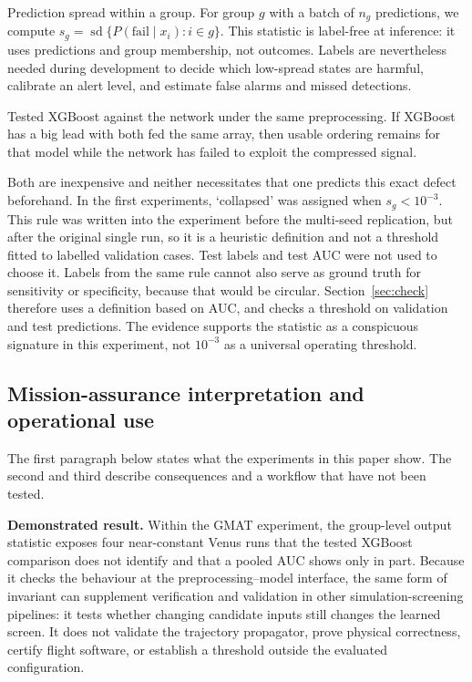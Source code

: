 \documentclass[preprint,12pt,authoryear,doubleblind]{elsarticle}
\begin{document}
Prediction spread within a group. For group $g$ with a batch of $n_g$ predictions, we compute $s_g=\operatorname{sd}\{P(\mathrm{fail}\mid x_i):i\in g\}$. This statistic is label-free at inference: it uses predictions and group membership, not outcomes. Labels are nevertheless needed during development to decide which low-spread states are harmful, calibrate an alert level, and estimate false alarms and missed detections.

Tested XGBoost against the network under the same preprocessing. If XGBoost has a big lead with both fed the same array, then usable ordering remains for that model while the network has failed to exploit the compressed signal.

Both are inexpensive and neither necessitates that one predicts this exact defect beforehand. In the first experiments, `collapsed' was assigned when $s_g<10^{-3}$. This rule was written into the experiment before the multi-seed replication, but after the original single run, so it is a heuristic definition and not a threshold fitted to labelled validation cases. Test labels and test AUC were not used to choose it. Labels from the same rule cannot also serve as ground truth for sensitivity or specificity, because that would be circular. Section~\ref{sec:check} therefore uses a definition based on AUC, and checks a threshold on validation and test predictions. The evidence supports the statistic as a conspicuous signature in this experiment, not $10^{-3}$ as a universal operating threshold.

\subsection{Mission-assurance interpretation and operational use}

The first paragraph below states what the experiments in this paper show. The second and third describe consequences and a workflow that have not been tested.

\textbf{Demonstrated result.} Within the GMAT experiment, the group-level output statistic exposes four near-constant Venus runs that the tested XGBoost comparison does not identify and that a pooled AUC shows only in part. Because it checks the behaviour at the preprocessing--model interface, the same form of invariant can supplement verification and validation in other simulation-screening pipelines: it tests whether changing candidate inputs still changes the learned screen. It does not validate the trajectory propagator, prove physical correctness, certify flight software, or establish a threshold outside the evaluated configuration.
\end{document}
